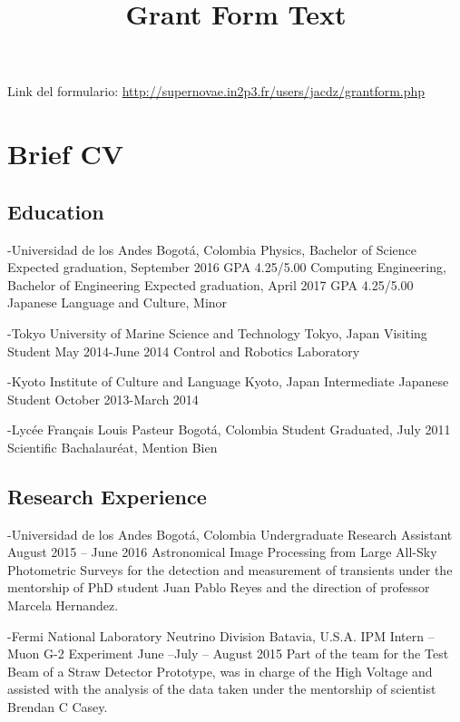 \documentclass[12pt]{article}
\begin{document}
\title{Grant Form Text}





\maketitle

\begin{center}
Link del formulario: \url{http://supernovae.in2p3.fr/users/jacdz/grantform.php}
\end{center}


\normalsize
\section{Brief CV}



\subsection{Education}
-Universidad de los Andes	Bogotá, Colombia
Physics, Bachelor of Science	 
Expected graduation, September 2016
GPA 4.25/5.00
Computing Engineering, Bachelor of Engineering
Expected graduation, April 2017
GPA 4.25/5.00
Japanese Language and Culture, Minor

-Tokyo University of Marine Science and Technology	Tokyo, Japan
Visiting Student			 May 2014-June 2014
Control and Robotics Laboratory

-Kyoto Institute of Culture and Language		Kyoto, Japan
Intermediate Japanese Student		October 2013-March 2014
	 
-Lycée Français Louis Pasteur	                    Bogotá, Colombia
Student		Graduated, July 2011
Scientific Bachalauréat, Mention Bien

\subsection{Research Experience}
-Universidad de los Andes	Bogotá, Colombia
Undergraduate Research Assistant	August 2015 – June 2016
Astronomical Image Processing from Large All-Sky Photometric Surveys for the detection and measurement of transients under the mentorship of PhD student Juan Pablo Reyes and the direction of professor Marcela Hernandez.

-Fermi National Laboratory	Neutrino Division	Batavia, U.S.A.
IPM Intern – Muon G-2 Experiment		June –July – August  2015
Part of the team for the Test Beam of a Straw Detector Prototype, was in charge of the High Voltage and assisted with the analysis of the data taken under the mentorship of scientist Brendan C Casey. 
\end{document}

